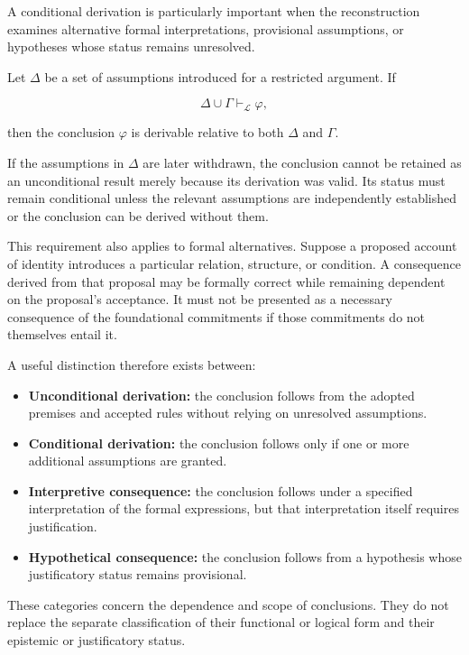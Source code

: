 A conditional derivation is particularly important when the
reconstruction examines alternative formal interpretations,
provisional assumptions, or hypotheses whose status remains
unresolved.

Let \(\Delta\) be a set of assumptions introduced for a restricted
argument. If

\[
    \Delta \cup \Gamma
    \vdash_{\mathcal{L}}
    \varphi,
\]

then the conclusion \(\varphi\) is derivable relative to both
\(\Delta\) and \(\Gamma\).

If the assumptions in \(\Delta\) are later withdrawn, the conclusion
cannot be retained as an unconditional result merely because its
derivation was valid. Its status must remain conditional unless
the relevant assumptions are independently established or the
conclusion can be derived without them.

This requirement also applies to formal alternatives. Suppose a
proposed account of identity introduces a particular relation,
structure, or condition. A consequence derived from that proposal
may be formally correct while remaining dependent on the proposal's
acceptance. It must not be presented as a necessary consequence
of the foundational commitments if those commitments do not
themselves entail it.

A useful distinction therefore exists between:

\begin{itemize}
    \item \textbf{Unconditional derivation:} the conclusion follows
    from the adopted premises and accepted rules without relying
    on unresolved assumptions.

    \item \textbf{Conditional derivation:} the conclusion follows
    only if one or more additional assumptions are granted.

    \item \textbf{Interpretive consequence:} the conclusion follows
    under a specified interpretation of the formal expressions,
    but that interpretation itself requires justification.

    \item \textbf{Hypothetical consequence:} the conclusion follows
    from a hypothesis whose justificatory status remains
    provisional.
\end{itemize}

These categories concern the dependence and scope of conclusions.
They do not replace the separate classification of their
functional or logical form and their epistemic or justificatory
status.

